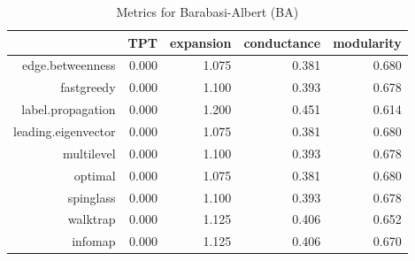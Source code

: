 \documentclass[paper=a4, fontsize=11pt]{scrartcl} %
\begin{document}
\begin{table}[ht]
\centering
\begin{tabular}{rrrrr}
  \hline
 & TPT & expansion & conductance & modularity \\ 
  \hline
edge.betweenness & 0.000 & 1.075 & 0.381 & 0.680 \\ 
  
             fastgreedy & 0.000 & 1.100 & 0.393 & 0.678 \\ 
  
             label.propagation & 0.000 & 1.200 & 0.451 & 0.614 \\ 
  
             leading.eigenvector & 0.000 & 1.075 & 0.381 & 0.680 \\ 
  
             multilevel & 0.000 & 1.100 & 0.393 & 0.678 \\ 
  
             optimal & 0.000 & 1.075 & 0.381 & 0.680 \\ 
  
             spinglass & 0.000 & 1.100 & 0.393 & 0.678 \\ 
  
             walktrap & 0.000 & 1.125 & 0.406 & 0.652 \\ 
  
             infomap & 0.000 & 1.125 & 0.406 & 0.670 \\ 
   \hline
\end{tabular}
\caption{Metrics for Barabasi-Albert (BA)} 
\end{table}
\end{document}
